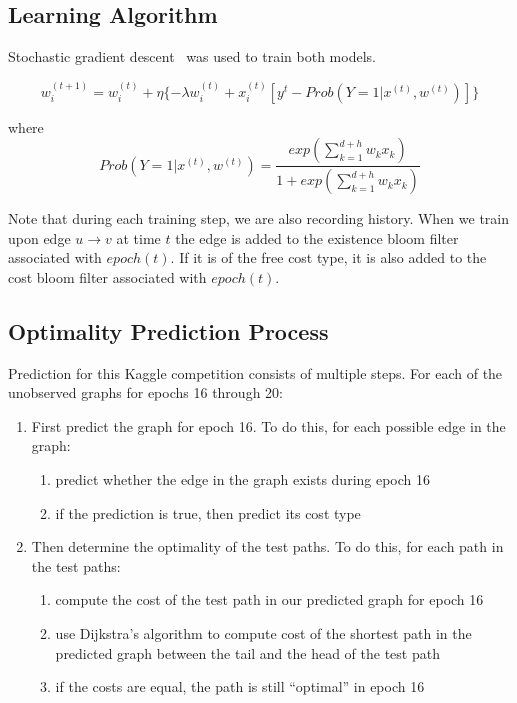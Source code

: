\documentclass{article} %
\begin{document}
\subsection{Learning Algorithm}

Stochastic gradient descent~\cite{rand}\cite{online} was used to train both models.

\begin{displaymath}
w_i^{(t+1)} = w_i^{(t)} + \eta \{- \lambda w_i^{(t)} + x_i^{(t)} [ y^t -  Prob(Y=1|x^{(t)},w^{(t)})] \}
\end{displaymath}

where
\begin{displaymath}
Prob(Y=1|x^{(t)},w^{(t)}) = \frac{exp(\sum_{k=1}^{d+h} w_kx_k)}{1+exp(\sum_{k=1}^{d+h} w_kx_k)}
\end{displaymath}

Note that during each training step, we are also recording history.  When we
train upon edge $u \rightarrow v$ at time $t$ the edge is added to the
existence bloom filter associated with $epoch(t)$.  If it is of the free
cost type, it is also added to the cost bloom filter associated with
$epoch(t)$.

\subsection{Optimality Prediction Process}
\label{sec-pred}

Prediction for this Kaggle competition consists of multiple steps.  For each
of the unobserved graphs for epochs 16 through 20:

\begin{enumerate}
\item First predict the graph for epoch 16.  To do this, for each possible edge in the graph:
  \begin{enumerate}
  \item predict whether the edge in the graph exists during epoch 16
  \item if the prediction is true, then predict its cost type
  \end{enumerate}
\item Then determine the optimality of the test paths.  To do this, for each path in the test paths:
  \begin{enumerate}
  \item compute the cost of the test path in our predicted graph for epoch 16
  \item use Dijkstra's algorithm to compute cost of the shortest path in the
    predicted graph between the tail and the head of the test path
  \item if the costs are equal, the path is still ``optimal'' in epoch 16
  \end{enumerate}
\end{enumerate}
\end{document}
